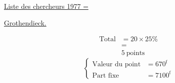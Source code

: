 \uline{Liste des chercheurs 1977 =}

\uline{ Grothendieck.}

\[
\begin{aligned}
\text{Total}&=20\times25\%\\
&=\\[-.2em]
&\boxed{5\ \text{points}}
\end{aligned}
\]
\[
\left\{\begin{aligned}
\text{Valeur du point}&=670^{\mathrm f}\\
\text{Part fixe}&=7100^{\mathrm f}
\end{aligned}\right.
\]
